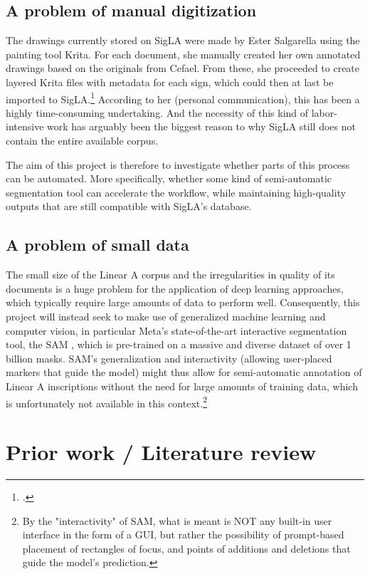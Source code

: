 \subsection{A problem of manual digitization}

The drawings currently stored on SigLA were made by Ester Salgarella using the painting tool Krita.
For each document, she manually created her own annotated drawings based on the originals from \acs{Cefael}.
From these, she proceeded to create layered Krita files with metadata for each sign, which could then at last be imported to SigLA.\footcite{SalgarellaCastellanSigLA2020}
According to her (personal communication), this has been a highly time-consuming undertaking. 
And the necessity of this kind of labor-intensive work has arguably been the biggest reason to why SigLA still does not contain the entire available corpus.

The aim of this project is therefore to investigate whether parts of this process can be automated. More specifically, whether some kind of semi-automatic segmentation tool 
can accelerate the workflow, while maintaining high-quality outputs that are still compatible with SigLA's database.

\subsection{A problem of small data}
The small size of the Linear A corpus and the irregularities in quality of its documents is a huge problem for the application of deep learning approaches, which typically require large amounts of data to perform well.
Consequently, this project will instead seek to make use of generalized machine learning and computer vision, in particular Meta's state-of-the-art interactive segmentation tool, the \acf{SAM} \parencite{sam}, which is pre-trained on a massive and diverse dataset of over 1 billion masks.
\acs{SAM}'s generalization and interactivity (allowing user-placed markers that guide the model) might thus allow for semi-automatic annotation of Linear A inscriptions without the need for large amounts of training data, which is unfortunately not available in this context.\footnote{By the "interactivity" of \acs{SAM}, what is meant is NOT any built-in user interface in the form of a GUI, but rather the possibility of prompt-based placement of rectangles of focus, and points of additions and deletions that guide the model's prediction.}

\section{Prior work / Literature review}

